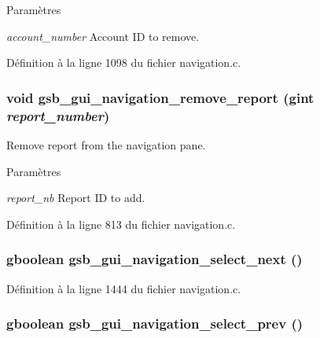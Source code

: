 \begin{DoxyParams}{Paramètres}
\item[{\em account\_\-number}]Account ID to remove. \end{DoxyParams}


Définition à la ligne 1098 du fichier navigation.c.

\subsubsection[{gsb\_\-gui\_\-navigation\_\-remove\_\-report}]{\setlength{\rightskip}{0pt plus 5cm}void gsb\_\-gui\_\-navigation\_\-remove\_\-report (gint {\em report\_\-number})}\label{navigation_8c_a8a6328e785b95ea6e2ee4163e6c71edc}
Remove report from the navigation pane.


\begin{DoxyParams}{Paramètres}
\item[{\em report\_\-nb}]Report ID to add. \end{DoxyParams}


Définition à la ligne 813 du fichier navigation.c.

\subsubsection[{gsb\_\-gui\_\-navigation\_\-select\_\-next}]{\setlength{\rightskip}{0pt plus 5cm}gboolean gsb\_\-gui\_\-navigation\_\-select\_\-next ()}\label{navigation_8c_a90ca4d003b85ca3c49ed7a7188a6ab60}


Définition à la ligne 1444 du fichier navigation.c.

\subsubsection[{gsb\_\-gui\_\-navigation\_\-select\_\-prev}]{\setlength{\rightskip}{0pt plus 5cm}gboolean gsb\_\-gui\_\-navigation\_\-select\_\-prev ()}\label{navigation_8c_af59677879274f3120ba149db61d4cb0e}


